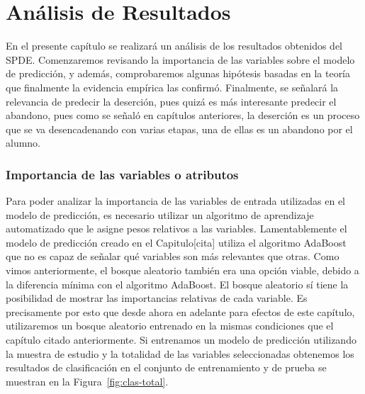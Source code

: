 \chapter{Análisis de Resultados}
\label{ch:anarel}

En el presente capítulo se realizará un análisis de los resultados obtenidos del SPDE. Comenzaremos revisando la importancia de las variables sobre el modelo de predicción, y además, comprobaremos algunas hipótesis basadas en la teoría que finalmente la evidencia empírica las confirmó. Finalmente, se señalará la relevancia de predecir la deserción, pues quizá es más interesante predecir el abandono, pues como se señaló en capítulos anteriores, la deserción es un proceso que se va desencadenando con varias etapas, una de ellas es un abandono por el alumno.

\subsection{Importancia de las variables o atributos}
Para poder analizar la importancia de las variables de entrada utilizadas en el modelo de predicción, es necesario utilizar un algoritmo de aprendizaje automatizado que le asigne pesos relativos a las variables. Lamentablemente el modelo de predicción creado en el Capitulo[cita] utiliza el algoritmo AdaBoost que no es capaz de señalar qué variables son más relevantes que otras. Como vimos anteriormente, el bosque aleatorio también era una opción viable, debido a la diferencia mínima con el algoritmo AdaBoost. El bosque aleatorio sí tiene la posibilidad de mostrar las importancias relativas de cada variable. Es precisamente por esto que desde ahora en adelante para efectos de este capítulo, utilizaremos un bosque aleatorio entrenado en la mismas condiciones que el capítulo citado anteriormente.
Si entrenamos un modelo de predicción utilizando la muestra de estudio y la totalidad de las variables seleccionadas obtenemos los resultados de clasificación en el conjunto de entrenamiento y de prueba se muestran en la Figura~\ref{fig:clas-total}.

